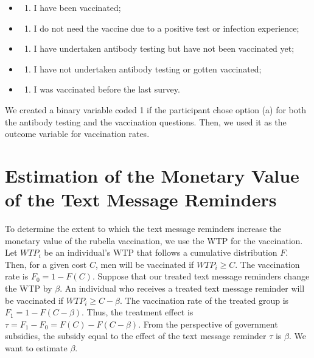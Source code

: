 \documentclass[
]{article}
\providecommand{\tightlist}{%
  \setlength{\itemsep}{0pt}\setlength{\parskip}{0pt}}
\begin{document}
\begin{itemize}
\item
  \begin{enumerate}
  \def\labelenumi{(\alph{enumi})}
  \tightlist
  \item
    I have been vaccinated;
  \end{enumerate}
\item
  \begin{enumerate}
  \def\labelenumi{(\alph{enumi})}
  \setcounter{enumi}{1}
  \tightlist
  \item
    I do not need the vaccine due to a positive test or infection experience;
  \end{enumerate}
\item
  \begin{enumerate}
  \def\labelenumi{(\alph{enumi})}
  \setcounter{enumi}{2}
  \tightlist
  \item
    I have undertaken antibody testing but have not been vaccinated yet;
  \end{enumerate}
\item
  \begin{enumerate}
  \def\labelenumi{(\alph{enumi})}
  \setcounter{enumi}{3}
  \tightlist
  \item
    I have not undertaken antibody testing or gotten vaccinated;
  \end{enumerate}
\item
  \begin{enumerate}
  \def\labelenumi{(\alph{enumi})}
  \setcounter{enumi}{4}
  \tightlist
  \item
    I was vaccinated before the last survey.
  \end{enumerate}
\end{itemize}

We created a binary variable coded 1 if the participant chose option (a) for both the antibody testing and the vaccination questions. Then, we used it as the outcome variable for vaccination rates.

\clearpage

\hypertarget{method-value}{%
\section{Estimation of the Monetary Value of the Text Message Reminders}\label{method-value}}

To determine the extent to which the text message reminders increase the monetary value of the rubella vaccination, we use the WTP for the vaccination. Let \(WTP_i\) be an individual's WTP that follows a cumulative distribution \(F\). Then, for a given cost \(C\), men will be vaccinated if \(WTP_i \ge C\). The vaccination rate is \(F_0 = 1-F(C)\). Suppose that our treated text message reminders change the WTP by \(\beta\). An individual who receives a treated text message reminder will be vaccinated if \(WTP_i\ge C-\beta\). The vaccination rate of the treated group is \(F_1 = 1-F(C-\beta)\). Thus, the treatment effect is \(\tau = F_1-F_0=F(C)-F(C-\beta)\). From the perspective of government subsidies, the subsidy equal to the effect of the text message reminder \(\tau\) is \(\beta\). We want to estimate \(\beta\).
\end{document}
